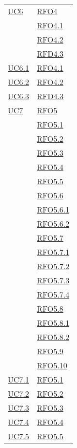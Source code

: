\begin{longtable}{|>{\centering}m{5cm}|m{5cm}<{\centering}|}
\hyperlink{UC6}{UC6} & \hyperlink{RFO4}{RFO4}\\
& \hyperlink{RFO4.1}{RFO4.1}\\
& \hyperlink{RFO4.2}{RFO4.2}\\
& \hyperlink{RFD4.3}{RFD4.3}\\\hline
\hyperlink{UC6.1}{UC6.1} & \hyperlink{RFO4.1}{RFO4.1}\\ \hline
\hyperlink{UC6.2}{UC6.2} & \hyperlink{RFO4.2}{RFO4.2}\\ \hline
\hyperlink{UC6.3}{UC6.3} & \hyperlink{RFD4.3}{RFD4.3}\\ \hline
\hyperlink{UC7}{UC7} & \hyperlink{RFO5}{RFO5}\\
& \hyperlink{RFO5.1}{RFO5.1}\\
& \hyperlink{RFO5.2}{RFO5.2}\\
& \hyperlink{RFO5.3}{RFO5.3}\\
& \hyperlink{RFO5.4}{RFO5.4}\\
& \hyperlink{RFO5.5}{RFO5.5}\\
& \hyperlink{RFO5.6}{RFO5.6}\\
& \hyperlink{RFO5.6.1}{RFO5.6.1}\\
& \hyperlink{RFO5.6.2}{RFO5.6.2}\\
& \hyperlink{RFO5.7}{RFO5.7}\\
& \hyperlink{RFO5.7.1}{RFO5.7.1}\\
& \hyperlink{RFO5.7.2}{RFO5.7.2}\\
& \hyperlink{RFO5.7.3}{RFO5.7.3}\\
& \hyperlink{RFO5.7.4}{RFO5.7.4}\\
& \hyperlink{RFO5.8}{RFO5.8}\\
& \hyperlink{RFO5.8.1}{RFO5.8.1}\\
& \hyperlink{RFO5.8.2}{RFO5.8.2}\\
& \hyperlink{RFO5.9}{RFO5.9}\\
& \hyperlink{RFO5.10}{RFO5.10}\\ \hline
\hyperlink{UC7.1}{UC7.1} & \hyperlink{RFO5.1}{RFO5.1}\\\hline
\hyperlink{UC7.2}{UC7.2} & \hyperlink{RFO5.2}{RFO5.2}\\\hline
\hyperlink{UC7.3}{UC7.3} & \hyperlink{RFO5.3}{RFO5.3}\\\hline
\hyperlink{UC7.4}{UC7.4} & \hyperlink{RFO5.4}{RFO5.4}\\\hline
\hyperlink{UC7.5}{UC7.5} & \hyperlink{RFO5.5}{RFO5.5}\\\hline

\end{longtable}